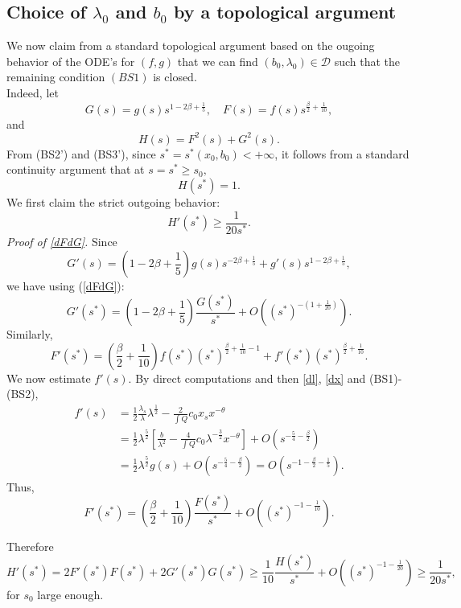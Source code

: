 \documentclass[11pt,a4paper,reqno]{amsart}
\theoremstyle{remark}
\numberwithin{equation}{section}
\newcommand{\be}{\begin{equation}}
\newcommand{\ee}{\end{equation}}
\def\fref#1{{\rm (\ref{#1})}}
\def\fref#1{{\rm (\ref{#1})}}
\def\l{\lambda}
\begin{document}
\subsection{Choice of $\l_0$ and $b_0$ by a topological argument} We now claim from a standard topological argument based on the ougoing behavior of the ODE's for $(f,g)$ that we can find $(b_0,\l_0)\in \mathcal D$ such that the remaining condition $(BS1)$ is closed.\\
Indeed, let $$
G(s) = g(s) s^{1-2 \beta + \frac 1{5}},\quad
F(s) = f(s) s^{\frac \beta 2+ \frac 1{10}},
$$
and
$$
H(s) = F^2(s) + G^2(s).
$$
From (BS2') and (BS3'), since $s^*=s^*(x_0,b_0)<+\infty$, it follows from a standard continuity argument that at $s=s^* \geq s_0,$
\be\label{sature}
H(s^*)=1.
\ee
We first claim the strict outgoing behavior:
\be\label{dFdG}
H'(s^*)\geq \frac {1}{20 s^*}.
\ee
\emph{Proof of \eqref{dFdG}.}
Since
$$
G'(s) = \left(1- 2 \beta +\frac 1{5}\right) g(s)s^{-2 \beta + \frac 1{5}}
+g'(s) s^{1-2 \beta + \frac 1{5}},
 $$
 we have using \fref{dFdG}:
 \be\label{gstar}
 G'(s^*)= \left(1- 2 \beta +\frac 1{5}\right) \frac {G(s^*)}{s^*}
 +O\left((s^*)^{-(1+\frac 1{20})}\right).
 \ee
 Similarly,
 $$
 F'(s^*)= \left(\frac \beta 2+ \frac 1{10}\right) f(s^*) (s^*)^{\frac \beta 2+ \frac 1{10}-1}
 + f'(s^*) (s^*)^{\frac \beta 2+ \frac 1{10}}.
 $$
 We now estimate $f'(s)$. By direct computations and then \eqref{dl}, \eqref{dx}
 and (BS1)-(BS2), 
 \begin{align*}
 f'(s) &= \frac 12 \frac {\l_s}{\l} \l^{\frac 12} - \frac 2{\int Q}c_0 
   x_s x^{-\theta}  \\
 & = \frac 12 \l^{\frac 52} \left[
 \frac b{\l^2}  - \frac 4{\int Q} c_0  \l^{-\frac 32} x^{-\theta}\right]
+O\left(s^{-\frac 54-\frac \beta 2}\right) \\
 &= \frac 12 \l^{\frac 52} g(s) + O\left(s^{-\frac 54-\frac \beta 2}\right) 
 = O\left(s^{-1  -\frac \beta 2 -\frac 1{5}}\right).
 \end{align*}
 Thus, 
 \be\label{fstar}
 F'(s^*)=\left(\frac \beta 2+ \frac 1{10}\right) \frac {F(s^*)} {s^*} + O\left( (s^*)^{-1-\frac 1{10}} \right). 
 \ee
 
 Therefore
 $$
 H'(s^*) = 2 F'(s^*)F(s^*) + 2 G'(s^*) G(s^*) 
 \geq \frac 1{10} \frac {H(s^*)}{s^*} + O\left((s^*)^{-1-\frac 1{20}}\right)
 \geq \frac 1{20s^*},
 $$
for $s_0$ large enough.

\medskip
\end{document}
